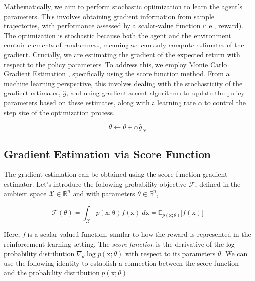 \noindent Mathematically, we aim to perform stochastic optimization to learn the agent’s parameters. This involves obtaining gradient information from sample trajectories, with performance assessed by a scalar-value function (i.e., reward). The optimization is stochastic because both the agent and the environment contain elements of randomness, meaning we can only compute estimates of the gradient. Crucially, we are estimating the gradient of the expected return with respect to the policy parameters. To address this, we employ Monte Carlo Gradient Estimation \citep{mohamed2020monte}, specifically using the score function method. From a machine learning perspective, this involves dealing with the stochasticity of the gradient estimates, $\hat{g}$, and using gradient ascent algorithms to update the policy parameters based on these estimates, along with a learning rate $\alpha$ to control the step size of the optimization process.

\begin{equation}\label{eqn:gradient-ascent}
    \theta \leftarrow \theta + \alpha \hat{g}_{N}
\end{equation}


\subsection{Gradient Estimation via Score Function}\label{sec:gradient-estimation-score-function}

The gradient estimation can be obtained using the score function gradient estimator. Let's introduce the following probability objective $\mathcal{F}$, defined in the \href{https://en.wikipedia.org/wiki/Ambient_space_(mathematics)}{ambient space} $\mathcal{X}\in\mathbb{R}^n$ and with parameters $\theta\in\mathbb{R}^n$,

\begin{equation}\label{eqn:probability-objective}
\mathcal{F}(\theta) = \int_{\mathcal{X}} p(\mathrm{x; \theta})f(\mathrm{x})~d\mathrm{x} = \mathbb{E}_{p(\mathrm{x};\theta)}\big[f(\mathrm{x})\big]
\end{equation}

\noindent Here, $f$ is a scalar-valued function, similar to how the reward is represented in the reinforcement learning setting. The \textit{score function} is the derivative of the log probability distribution $\nabla_{\theta}\log p(\mathrm{x};\theta)$ with respect to its parameters $\theta$. We
can use the following identity to establish a connection between
the score function and the probability distribution $p(\mathrm{x};\theta)$.

